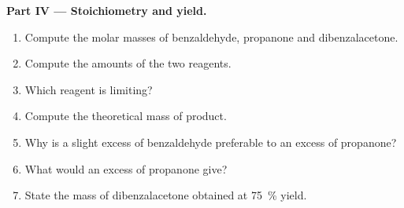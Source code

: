 \begin{problem}
\medskip
\noindent\textbf{Part IV --- Stoichiometry and yield.}
\begin{enumerate}[resume]
  \item Compute the molar masses of benzaldehyde, propanone and dibenzalacetone.
  \item Compute the amounts of the two reagents.
  \item Which reagent is limiting?
  \item Compute the theoretical mass of product.
  \item Why is a slight excess of benzaldehyde preferable to an excess of propanone?
  \item What would an excess of propanone give?
  \item State the mass of dibenzalacetone obtained at 75~\% yield.
\end{enumerate}
\end{problem}
